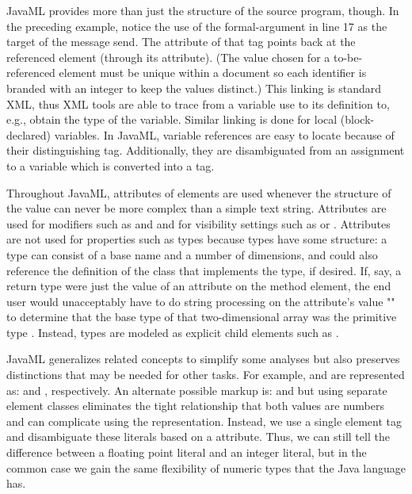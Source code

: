 \documentclass{article}
\begin{document}
\begin{multicols}{2}
JavaML provides more than just the structure of the source program,
though.  In the preceding example, notice the use of the formal-argument
 in line 17 as the target of the message send.  The
 attribute of that  tag points back at
the referenced  element (through its
 attribute).  (The  value chosen for a
to-be-referenced element must be unique within a document so each
identifier is branded with an integer to keep the values distinct.)
This linking is standard XML, thus XML tools are able to trace from a
variable use to its definition to, e.g., obtain the type of the
variable.  Similar linking is done for local (block-declared) variables.
In JavaML, variable references are easy to locate because of their
distinguishing  tag.  Additionally, they are
disambiguated from an assignment to a variable which is converted into a
 tag.

Throughout JavaML, attributes of elements are used whenever the
structure of the value can never be more complex than a simple text
string.  Attributes are used for modifiers such as
 and  and for visibility settings
such as  or .  Attributes are not
used for properties such as types because types have some structure: a
type can consist of a base name and a number of dimensions, and could
also reference the definition of the class that implements the type, if
desired.  If, say, a return type were just the value of an attribute on
the method element, the end user would unacceptably have to do string
processing on the attribute's value "" to determine
that the base type of that two-dimensional array was the primitive type
.  Instead, types are modeled as explicit child elements
such as .

JavaML generalizes related concepts to simplify some analyses but also
preserves distinctions that may be needed for other tasks.  For example,
 and  are represented as:
 and
, respectively.  An
alternate possible markup is: 
and  but using separate element
classes eliminates the tight relationship that both values are numbers
and can complicate using the representation.  Instead, we use a single
element tag and disambiguate these literals based on a 
attribute. Thus, we can still tell the difference between a floating
point literal and an integer literal, but in the common case we gain the
same flexibility of numeric types that the Java language has.


\end{multicols}
\end{document}
